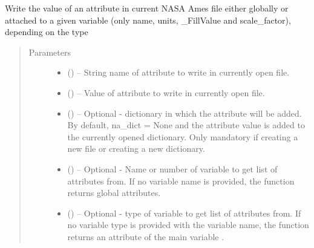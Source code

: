 \documentclass[a4paper,10pt,openany,english]{sphinxmanual}
\begin{document}
\begin{fulllineitems}

\begin{fulllineitems}
\label{egadsapi:egads.input.nasa_ames_io.NasaAmes.write_attribute_value}
Write the value of an attribute in current NASA Ames file either globally or
attached to a given variable (only name, units, \_FillValue and scale\_factor), 
depending on the type
\begin{quote}\begin{description}
\item[{Parameters}] \leavevmode\begin{itemize}
\item {} 
 () -- String name of attribute to write in currently open file.

\item {} 
 () -- Value of attribute to write in currently open file.

\item {} 
 () -- Optional - dictionary in which the attribute will be added. By default, na\_dict = None 
and the attribute value is added to the currently opened dictionary. Only mandatory 
if creating a new file or creating a new dictionary.

\item {} 
 () -- Optional - Name or number of variable to get list of attributes from. If no
variable name is provided, the function returns global attributes.

\item {} 
 () -- Optional - type of variable to get list of attributes from. If no variable type     
is provided with the variable name, the function returns an attribute
of the main variable .

\end{itemize}

\end{description}\end{quote}


\end{fulllineitems}
\end{fulllineitems}
\end{document}
